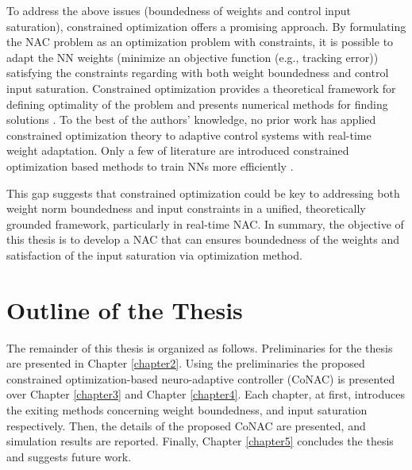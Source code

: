 To address the above issues (boundedness of weights and control input saturation), constrained optimization offers a promising approach. 
By formulating the NAC problem as an optimization problem with constraints, it is possible to adapt the NN weights (minimize an objective function (e.g., tracking error)) satisfying the constraints regarding with both weight boundedness and control input saturation. 
Constrained optimization provides a theoretical framework for defining optimality of the problem and presents numerical methods for finding solutions \cite{RN9}.
To the best of the authors’ knowledge, no prior work has applied constrained optimization theory to adaptive control systems with real-time weight adaptation.
Only a few of literature are introduced constrained optimization based methods to train NNs more efficiently \cite{RN62, RN98, RN94}.

This gap suggests that constrained optimization could be key to addressing both weight norm boundedness and input constraints in a unified, theoretically grounded framework, particularly in real-time NAC.
In summary, the objective of this thesis is to develop a NAC that can ensures boundedness of the weights and satisfaction of the input saturation via optimization method.

\section{Outline of the Thesis} 

The remainder of this thesis is organized as follows. 
Preliminaries for the thesis are presented in Chapter \ref{chapter2}.
Using the preliminaries the proposed constrained optimization-based neuro-adaptive controller (CoNAC) is presented over Chapter \ref{chapter3} and Chapter \ref{chapter4}.
Each chapter, at first, introduces the exiting methods concerning weight boundedness, and input saturation respectively.
Then, the details of the proposed CoNAC are presented, and simulation results are reported.
Finally, Chapter \ref{chapter5} concludes the thesis and suggests future work.
